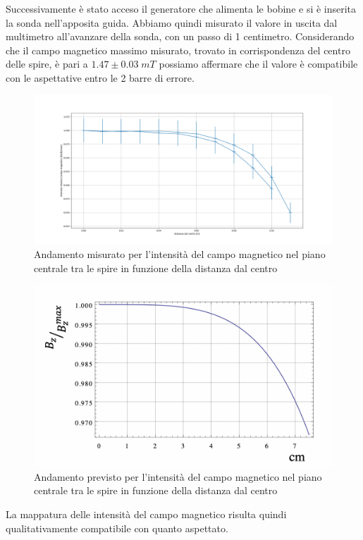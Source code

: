\documentclass[10pt, a4paper, italian]{article}
\begin{document}
Successivamente è stato acceso il generatore che alimenta le bobine e si è inserita la sonda nell'apposita guida. Abbiamo quindi misurato il valore in uscita dal multimetro all'avanzare della sonda, con un passo di 1 centimetro.
Considerando che il campo magnetico massimo misurato, trovato in corrispondenza del centro delle spire, è pari a $1.47 \pm 0.03 \;mT$ possiamo affermare che il valore è compatibile con le aspettative entro le 2 barre di errore.
\begin{figure}
\includegraphics[width=\textwidth]{sounasegaiochiamalocomecazzotiparetantocifounasegaio}
\caption{Andamento misurato per l'intensità del campo magnetico nel piano centrale tra le spire in funzione della distanza dal centro}
\end{figure}
\begin{figure}
\includegraphics[width=\textwidth]{riferimentoB}
\caption{Andamento previsto per l'intensità del campo magnetico nel piano centrale tra le spire in funzione della distanza dal centro}
\end{figure}
La mappatura delle intensità del campo magnetico risulta quindi qualitativamente compatibile con quanto aspettato.
\end{document}

